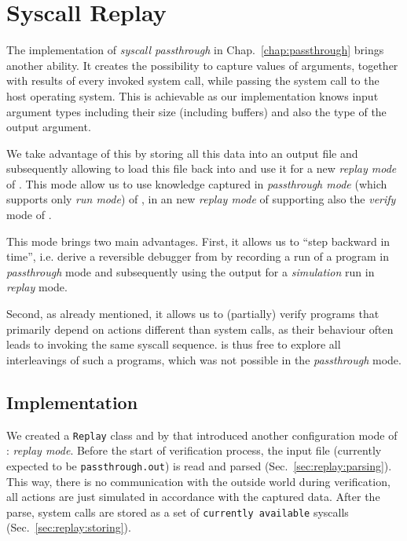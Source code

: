 \chapter{Syscall Replay } \label{chap:replay}

The implementation of \textit{syscall passthrough} in Chap.~\ref{chap:passthrough} brings another ability. It creates the possibility to capture values of arguments, together with results of every invoked system call, while passing the system call to the host operating system. This is achievable as our implementation knows input argument types including their size (including buffers) and also the type of the output argument. 

We take advantage of this by storing all this data into an output file and subsequently allowing to load this file back into \divine and use it for a new \textit{replay mode} of \dios. This mode allow us to use knowledge captured in \textit{passthrough mode} (which supports only \textit{run mode}) of \divine, in an new \textit{replay mode} of \dios supporting also the \textit{verify} mode of \divine. 

This mode brings two main advantages. First, it allows us to ``step backward in time'', i.e. derive a reversible debugger from \divine by recording a run of a program in \textit{passthrough} mode and subsequently using the output for a \textit{simulation} run in \textit{replay} mode. 

Second, as already mentioned, it allows us to (partially) verify programs that primarily depend on actions different than system calls, as their behaviour often leads to invoking the same syscall sequence. \divine is thus free to explore all interleavings of such a programs, which was not possible in the \textit{passthrough} mode.

\section{Implementation}

We created a \texttt{Replay} class and by that introduced another configuration mode of \dios: \textit{replay mode}. Before the start of verification process, the input file (currently expected to be \texttt{passthrough.out}) is read and parsed (Sec.~\ref{sec:replay:parsing}). This way, there is no communication with the outside world during verification, all actions are just simulated in accordance with the captured data. After the parse, system calls are stored as a set of \texttt{currently available} syscalls (Sec.~\ref{sec:replay:storing}).


